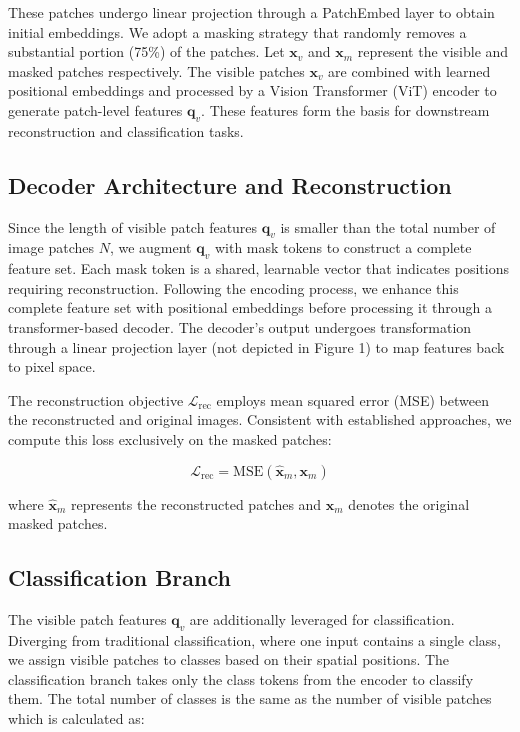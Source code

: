 These patches undergo linear projection through a PatchEmbed layer to obtain initial embeddings. We adopt a masking strategy that randomly removes a substantial portion (75\%) of the patches. Let $\mathbf{x}_v$ and $\mathbf{x}_m$ represent the visible and masked patches respectively. The visible patches $\mathbf{x}_v$ are combined with learned positional embeddings and processed by a Vision Transformer (ViT) encoder to generate patch-level features $\mathbf{q}_v$. These features form the basis for downstream reconstruction and classification tasks.

\subsection{Decoder Architecture and Reconstruction}

Since the length of visible patch features $\mathbf{q}_v$ is smaller than the total number of image patches $N$, we augment $\mathbf{q}_v$ with mask tokens to construct a complete feature set. Each mask token is a shared, learnable vector that indicates positions requiring reconstruction. Following the encoding process, we enhance this complete feature set with positional embeddings before processing it through a transformer-based decoder. The decoder's output undergoes transformation through a linear projection layer (not depicted in Figure 1) to map features back to pixel space. 

The reconstruction objective $\mathcal{L}_{\text{rec}}$ employs mean squared error (MSE) between the reconstructed and original images. Consistent with established approaches, we compute this loss exclusively on the masked patches:

\begin{equation}
    \mathcal{L}_{\text{rec}} = \text{MSE}(\hat{\mathbf{x}}_m, \mathbf{x}_m)
\end{equation}

where $\hat{\mathbf{x}}_m$ represents the reconstructed patches and $\mathbf{x}_m$ denotes the original masked patches.


\subsection{Classification Branch}

The visible patch features $\mathbf{q}_v$ are additionally leveraged for classification. Diverging from traditional classification, where one input contains a single class, we assign visible patches to classes based on their spatial positions. The classification branch takes only the class tokens from the encoder to classify them. The total number of classes is the same as the number of visible patches which is calculated as:

